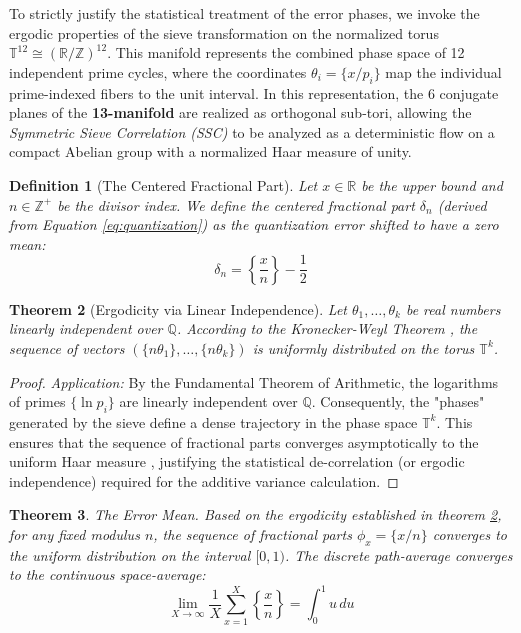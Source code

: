 \documentclass[sn-mathphys-num, pdflatex]{sn-jnl}
\newtheorem{theorem}{Theorem}[section]
\newtheorem{definition}[theorem]{Definition}
\begin{document}
To strictly justify the statistical treatment of the error phases, we invoke the ergodic properties of the sieve transformation on the normalized torus $\mathbb{T}^{12} \cong (\mathbb{R}/\mathbb{Z})^{12}$. This manifold represents the combined phase space of 12 independent prime cycles, where the coordinates $\theta_i = \{x/p_i\}$ map the individual prime-indexed fibers to the unit interval. In this representation, the 6 conjugate planes of the \textbf{13-manifold} are realized as orthogonal sub-tori, allowing the \textit{Symmetric Sieve Correlation (SSC)} to be analyzed as a deterministic flow on a compact Abelian group with a normalized Haar measure of unity.

\begin{definition}[The Centered Fractional Part]
Let $x \in \mathbb{R}$ be the upper bound and $n \in \mathbb{Z}^{+}$ be the divisor index. We define the centered fractional part $\delta_{n}$ (derived from Equation \ref{eq:quantization}) as the quantization error shifted to have a zero mean:
\begin{equation}
\delta_{n} = \left\{\frac{x}{n}\right\} - \frac{1}{2}
\end{equation}
\end{definition}

\begin{theorem}[Ergodicity via Linear Independence]
\label{theorem:equidistribution}
Let $\theta_{1}, \dots, \theta_{k}$ be real numbers linearly independent over $\mathbb{Q}$. According to the Kronecker-Weyl Theorem \cite{weyl}, the sequence of vectors $(\{n\theta_{1}\}, \dots, \{n\theta_{k}\})$ is uniformly distributed on the torus $\mathbb{T}^{k}$.
\end{theorem}

\begin{proof}
\textit{Application:} By the Fundamental Theorem of Arithmetic, the logarithms of primes $\{\ln p_i\}$ are linearly independent over $\mathbb{Q}$. Consequently, the "phases" generated by the sieve define a dense trajectory in the phase space $\mathbb{T}^k$. This ensures that the sequence of fractional parts converges asymptotically to the uniform Haar measure \cite{halmos1950measure}, justifying the statistical de-correlation (or ergodic independence) required for the additive variance calculation.
\end{proof}

\begin{theorem}
\label{theorem:mean}
\textit{The Error Mean.}
Based on the ergodicity established in theorem \ref{theorem:equidistribution}, for any fixed modulus $n$, the sequence of fractional parts $\phi_x = \{x/n\}$ converges to the uniform distribution on the interval $[0, 1)$. The discrete path-average converges to the continuous space-average:
\begin{equation}
\lim_{X \to \infty} \frac{1}{X} \sum_{x=1}^{X} \left\{\frac{x}{n}\right\} = \int_0^1 u \, du
\end{equation}
\end{theorem}
\end{document}
